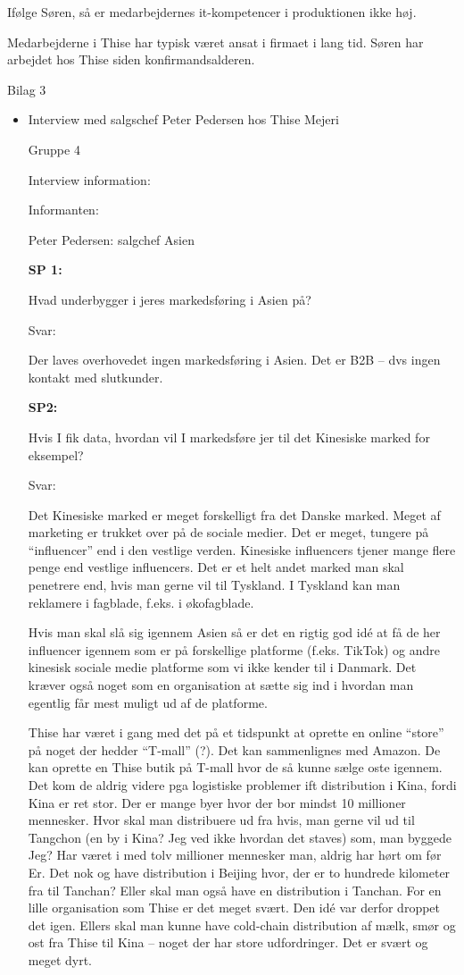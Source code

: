 \documentclass[
  12pt,
  a4paper,
  DIV=11,
  numbers=noendperiod]{scrartcl}
\begin{document}
Ifølge Søren, så er medarbejdernes it-kompetencer i produktionen ikke
høj.~

Medarbejderne i Thise har typisk været ansat i firmaet i lang tid. Søren
har arbejdet hos Thise siden konfirmandsalderen.~

Bilag 3~

\begin{itemize}
\item
  Interview med salgschef Peter Pedersen hos Thise Mejeri~

  Gruppe 4~

  Interview information:~

  Informanten:~

  Peter Pedersen: salgchef Asien~

  \textbf{SP 1:}~

  Hvad underbygger i jeres markedsføring i Asien på?~

  Svar:~

  Der laves overhovedet ingen markedsføring i Asien. Det er B2B -- dvs
  ingen kontakt med slutkunder.~

  \textbf{SP2:}~

  Hvis I fik data, hvordan vil I markedsføre jer til det Kinesiske
  marked for eksempel?~

  Svar:~

  Det Kinesiske marked er meget forskelligt fra det Danske marked. Meget
  af marketing er trukket over på de sociale medier. Det er meget,
  tungere på ``influencer'' end i den vestlige verden. Kinesiske
  influencers tjener mange flere penge end vestlige influencers. Det er
  et helt andet marked man skal penetrere end, hvis man gerne vil til
  Tyskland. I Tyskland kan man reklamere i fagblade, f.eks. i
  økofagblade.~

  Hvis man skal slå sig igennem Asien så er det en rigtig god idé at få
  de her influencer igennem som er på forskellige platforme (f.eks.
  TikTok) og andre kinesisk sociale medie platforme som vi ikke kender
  til i Danmark. Det kræver også noget som en organisation at sætte sig
  ind i hvordan man egentlig får mest muligt ud af de platforme.~

  Thise har været i gang med det på et tidspunkt at oprette en online
  ``store'' på noget der hedder ``T-mall'' (?). Det kan sammenlignes med
  Amazon. De kan oprette en Thise butik på T-mall hvor de så kunne sælge
  oste igennem. Det kom de aldrig videre pga logistiske problemer ift
  distribution i Kina, fordi Kina er ret stor. Der er mange byer hvor
  der bor mindst 10 millioner mennesker. Hvor skal man distribuere ud
  fra hvis, man gerne vil ud til Tangchon (en by i Kina? Jeg ved ikke
  hvordan det staves) som, man byggede Jeg? Har været i med tolv
  millioner mennesker man, aldrig har hørt om før Er. Det nok og have
  distribution i Beijing hvor, der er to hundrede kilometer fra til
  Tanchan? Eller skal man også have en distribution i Tanchan. For en
  lille organisation som Thise er det meget svært. Den idé var derfor
  droppet det igen. Ellers skal man kunne have cold-chain distribution
  af mælk, smør og ost fra Thise til Kina -- noget der har store
  udfordringer. Det er svært og meget dyrt.~


\end{itemize}
\end{document}

